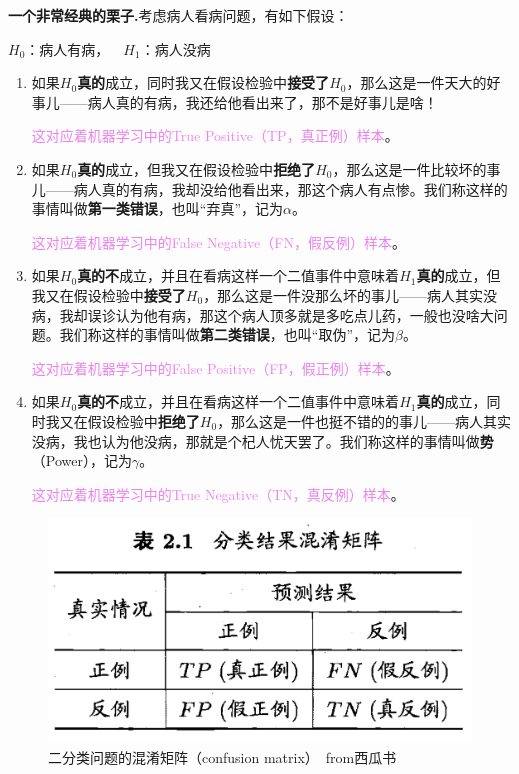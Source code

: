 \documentclass[10pt, a4paper]{article}
\begin{document}
\textbf{一个非常经典的栗子.}考虑病人看病问题，有如下假设：
\begin{center}
    $H_0$：病人有病，~~$H_1$：病人没病
\end{center} \par
\begin{enumerate}
    \item 如果$H_0$\textbf{真的}成立，同时我又在假设检验中\textbf{接受了$H_0$}，那么这是一件天大的好事儿——病人真的有病，我还给他看出来了，那不是好事儿是啥！\par {\textcolor{violet}{这对应着机器学习中的True Positive（TP，真正例）样本}}。
    \item 如果$H_0$\textbf{真的}成立，但我又在假设检验中\textbf{拒绝了$H_0$}，那么这是一件比较坏的事儿——病人真的有病，我却没给他看出来，那这个病人有点惨。我们称这样的事情叫做\textbf{第一类错误}，也叫“弃真”，记为$\alpha$。\par {\textcolor{violet}{这对应着机器学习中的False Negative（FN，假反例）样本}}。
    \item 如果$H_0$\textbf{真的不}成立，并且在看病这样一个二值事件中意味着$H_1$\textbf{真的}成立，但我又在假设检验中\textbf{接受了$H_0$}，那么这是一件没那么坏的事儿——病人其实没病，我却误诊认为他有病，那这个病人顶多就是多吃点儿药，一般也没啥大问题。我们称这样的事情叫做\textbf{第二类错误}，也叫“取伪”，记为$\beta$。\par {\textcolor{violet}{这对应着机器学习中的False Positive（FP，假正例）样本}}。
    \item 如果$H_0$\textbf{真的不}成立，并且在看病这样一个二值事件中意味着$H_1$\textbf{真的}成立，同时我又在假设检验中\textbf{拒绝了$H_0$}，那么这是一件也挺不错的的事儿——病人其实没病，我也认为他没病，那就是个杞人忧天罢了。我们称这样的事情叫做\textbf{势}（Power），记为$\gamma$。\par {\textcolor{violet}{这对应着机器学习中的True Negative（TN，真反例）样本}}。
\end{enumerate}

\begin{figure}[H]
    \centering
    \includegraphics[width=0.5\linewidth]{confusion.png}
    \caption{二分类问题的混淆矩阵（confusion matrix）~from西瓜书}
    \label{fig:confusioin}
\end{figure}
\end{document}
